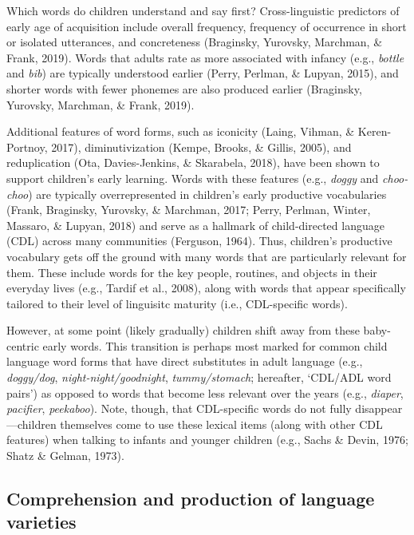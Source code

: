 \documentclass[10pt, letterpaper]{article}
\begin{document}
Which words do children understand and say first? Cross-linguistic
predictors of early age of acquisition include overall frequency,
frequency of occurrence in short or isolated utterances, and
concreteness (Braginsky, Yurovsky, Marchman, \& Frank, 2019). Words that
adults rate as more associated with infancy (e.g., \emph{bottle} and
\emph{bib}) are typically understood earlier (Perry, Perlman, \& Lupyan,
2015), and shorter words with fewer phonemes are also produced earlier
(Braginsky, Yurovsky, Marchman, \& Frank, 2019).

Additional features of word forms, such as iconicity (Laing, Vihman, \&
Keren-Portnoy, 2017), diminutivization (Kempe, Brooks, \& Gillis, 2005),
and reduplication (Ota, Davies-Jenkins, \& Skarabela, 2018), have been
shown to support children's early learning. Words with these features
(e.g., \emph{doggy} and \emph{choo-choo}) are typically overrepresented
in children's early productive vocabularies (Frank, Braginsky, Yurovsky,
\& Marchman, 2017; Perry, Perlman, Winter, Massaro, \& Lupyan, 2018) and
serve as a hallmark of child-directed language (CDL) across many
communities (Ferguson, 1964). Thus, children's productive vocabulary
gets off the ground with many words that are particularly relevant for
them. These include words for the key people, routines, and objects in
their everyday lives (e.g., Tardif et al., 2008), along with words that
appear specifically tailored to their level of linguisitc maturity
(i.e., CDL-specific words).

However, at some point (likely gradually) children shift away from these
baby-centric early words. This transition is perhaps most marked for
common child language word forms that have direct substitutes in adult
language (e.g., \emph{doggy/dog}, \emph{night-night/goodnight},
\emph{tummy/stomach}; hereafter, `CDL/ADL word pairs') as opposed to
words that become less relevant over the years (e.g., \emph{diaper},
\emph{pacifier}, \emph{peekaboo}). Note, though, that CDL-specific words
do not fully disappear---children themselves come to use these lexical
items (along with other CDL features) when talking to infants and
younger children (e.g., Sachs \& Devin, 1976; Shatz \& Gelman, 1973).

\hypertarget{comprehension-and-production-of-language-varieties}{%
\subsection{Comprehension and production of language
varieties}\label{comprehension-and-production-of-language-varieties}}
\end{document}
